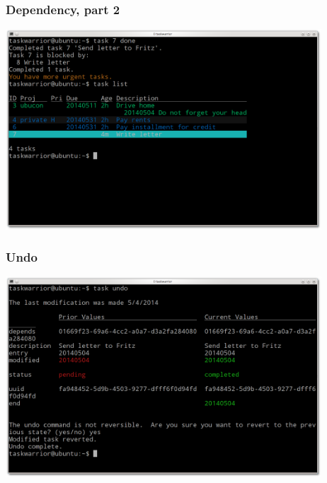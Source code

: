 \documentclass[t,handout]{beamer}
\begin{document}
\begin{frame}[fragile]\frametitle{Dependency, part 2}
\begin{center} %
\includegraphics[width=11.8cm,height=7.5cm]{dependency2.png}
\end{center}
\end{frame}

\begin{frame}[fragile]\frametitle{Undo}
\begin{center} %
\includegraphics[width=11.8cm,height=7.5cm]{undo.png}
\end{center}
\end{frame}
\end{document}
